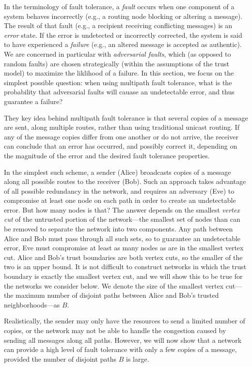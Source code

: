 \documentclass[prodmode,permissions]{acmsmall-ec16}
\begin{document}
In the terminology of fault tolerance, a {\em fault} occurs when one component
of a system behaves incorrectly (e.g., a routing node blocking or
altering a message).
The result of that fault (e.g., a recipient receiving conflicting messages)
is an {\em error} state.
If the error is undetected or incorrectly corrected, the system is
said to have experienced a {\em failure} (e.g., an altered message is
accepted as authentic).
We are concerned in particular with {\em adversarial faults},
which (as opposed to random faults)
are chosen strategically (within the assumptions of the trust model)
to maximize the liklihood of a failure.
In this section, we focus on the simplest possible question:
when using multipath fault tolerance,
what is the probability that adversarial faults will cauase an undetectable
error, and thus guarantee a failure?

They key idea behind multipath fault tolerance is that several copies of
a message are sent, along multiple routes,
rather than using traditional unicast routing.
If any of the message copies differ from one another or do not arrive,
the receiver can conclude that an error has occurred,
and possibly correct it, depending on the magnitude of the error
and the desired fault tolerance properties.

In the simplest such scheme, a sender (Alice) broadcasts copies of a message
along all possible routes to the receiver (Bob).
Such an approach takes advantage of all possible redundancy in the network,
and requires an adversary (Eve) to compromise at least one node on each path
in order to create an undetectable error.
But how many nodes is that?
The answer depends on the smallest {\em vertex cut} of the untrusted
portion of the network---the smallest set of nodes than can be removed
to separate the network into two components.
Any path between Alice and Bob must pass through all such sets,
so to guarantee an undetectable error, Eve must compromise at least as many
nodes as are in the smallest vertex cut.
Alice and Bob's trust boundaries are both vertex cuts,
so the smaller of the two is an upper bound.
It is not difficult to construct networks in which the trust boundary is exactly
the smallest vertex cut,
and we will show this to be true for the networks we consider below.
We denote the size of the smallest vertex cut---the
maximum number of disjoint paths between Alice and Bob's trusted
neighborhoods---as $B$.

Realistically, the sender may only have the resources to send a limited number of
copies, or the network may not be able to handle the congestion caused by
sending all messages along all paths.
However, we will now show that a network can provide a high level of
fault tolerance with only a few copies of a message,
provided the number of disjoint paths $B$ is large.
\end{document}

